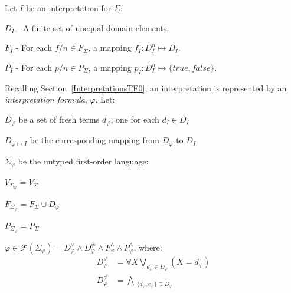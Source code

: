\documentclass{easychair}
\newenvironment{packed_itemize}{
\vspace*{-0.2em}
\begin{itemize}
\setlength{\partopsep}{0pt}
\setlength{\itemsep}{1pt}
\setlength{\parskip}{0pt}
\setlength{\parsep}{0pt}
}{\end{itemize}}
\newcommand{\true}{{\mathit{true}}}
\newcommand{\false}{{\mathit{false}}}
\begin{document}
\vspace*{1em}
\noindent
Let $I$ be an interpretation for $\Sigma$:
\begin{packed_itemize}
\item $D_I$ - A finite set of unequal domain elements.
\item $F_I$ - For each $f/n \in F_\Sigma$, a mapping $f_I: D_I^n \mapsto D_I$.
\item $P_I$ - For each $p/n \in P_\Sigma$, a mapping $p_I: D_I^n \mapsto \{\true,\false\}$.
\end{packed_itemize}

\newpage
\noindent
Recalling Section~\ref{InterpretationsTF0}, an interpretation is represented by an 
{\em interpretation formula}, $\varphi$.
Let:
\begin{packed_itemize}
\item $D_{\varphi}$ be a set of fresh terms $d_{\varphi}$, one for each $d_I \in D_I$
\item $D_{\varphi \mapsto I}$ be the corresponding mapping from $D_{\varphi}$ to $D_I$
\item $\Sigma_{\varphi}$ be the untyped first-order language:
      \begin{packed_itemize}
      \item $V_{\Sigma_{\varphi}} = V_\Sigma$
      \item $F_{\Sigma_{\varphi}} = F_\Sigma \cup D_{\varphi}$
      \item $P_{\Sigma_{\varphi}} = P_\Sigma$
      \end{packed_itemize}
\item $\varphi \in \mathcal{F}(\Sigma_{\varphi}) = 
D^\vee_{\varphi} \land D^{\neq}_{\varphi} \land F^\wedge_{\varphi} \land 
P^\wedge_{\varphi}$, where:
\begin{equation*}
\begin{split}
D^\vee_{\varphi}   &= \forall X \bigvee_{d_{\varphi} \in D_{\varphi}} \left(X = d_{\varphi} \right) \\
D^{\neq}_{\varphi} &= \bigwedge_{\substack{\{d_{\varphi},e_{\varphi}\} \subseteq D_{\varphi} \\
}}
\end{split}
\end{equation*}
\end{packed_itemize}
\end{document}
